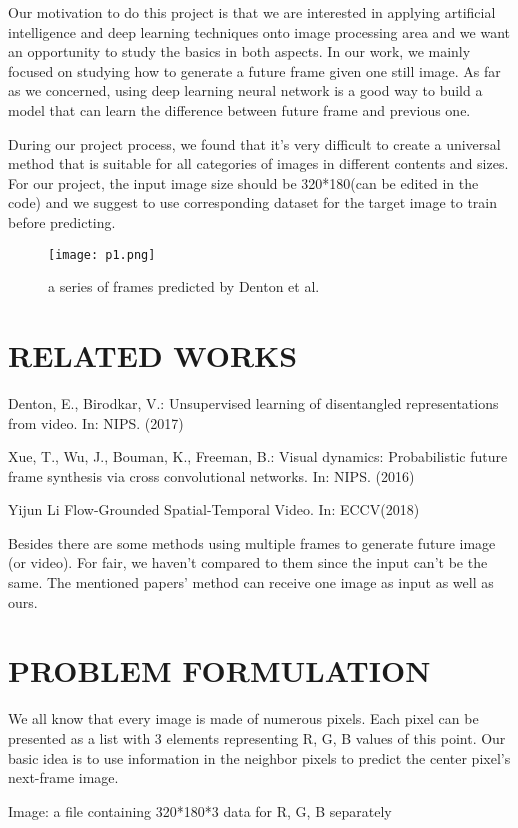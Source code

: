 \documentclass{acmtog} %
\begin{document}
Our motivation to do this project is that we are interested in applying artificial intelligence and deep learning techniques onto image processing area and we want an opportunity to study the basics in both aspects.
In our work, we mainly focused on studying how to generate a future frame given one still image. As far as we concerned, using deep learning neural network is a good way to build a model that can learn the difference between future frame and previous one. 

During our project process, we found that it’s very difficult to create a universal method that is suitable for all categories of images in different contents and sizes. For our project, the input image size should be 320*180(can be edited in the code) and we suggest to use corresponding dataset for the target image to train before predicting. 
%
\begin{figure}[h]
\centerline{\texttt{[image: p1.png]}}
\caption{a series of frames predicted by Denton et al.}
    \label{fig:Longtin_v_Moon_right_and_comparison}
\end{figure}
%
\section{RELATED WORKS}
\label{sec:RELATED WORKS}
Denton, E., Birodkar, V.: Unsupervised learning of disentangled representations from video. In: NIPS. (2017)

Xue, T., Wu, J., Bouman, K., Freeman, B.: Visual dynamics: Probabilistic future frame synthesis via cross convolutional networks. In: NIPS. (2016)

Yijun Li Flow-Grounded Spatial-Temporal Video. In: ECCV(2018)

Besides there are some methods using multiple frames to generate future image (or video). For fair, we haven’t compared to them since the input can’t be the same. The mentioned papers’ method can receive one image as input as well as ours.

\section{PROBLEM FORMULATION}
\label{sub:PROBLEM FORMULATION}
We all know that every image is made of numerous pixels. Each pixel can be presented as a list with 3 elements representing R, G, B values of this point. Our basic idea is to use information in the neighbor pixels to predict the center pixel’s next-frame image.

Image: a file containing 320*180*3 data for R, G, B separately
\end{document}
